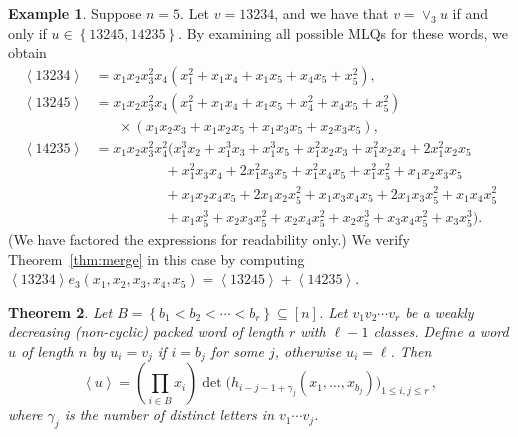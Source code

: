 \documentclass[reqno]{amsart}
\newcommand{\0}{\phantom{c}}
\newcommand{\swt}[1]{\left\langle #1 \right\rangle} %
\newcommand{\merge}[1]{\vee_{#1}} %
\let\prodnonlimits\prod
\renewcommand{\prod}{\prodnonlimits\limits}
\newcommand{\set}[1]{\left\{ #1 \right\}}
\newcommand{\ive}[1]{\left[ #1 \right]}
\theoremstyle{plain}
\newtheorem{thm}{Theorem}[section]
\theoremstyle{definition}
\newtheorem{example}[thm]{Example}
\numberwithin{equation}{section}
\begin{document}
\begin{example}
Suppose $n = 5$.
Let $v = 13234$, and we have that $v = \merge{3} u$ if and only if $u \in \set{13245, 14235}$.
By examining all possible MLQs for these words, we obtain
\begin{align*}
\swt{13234} & = x_1 x_2 x_3^2 x_4 (x_1^2 + x_1 x_4 + x_1 x_5 + x_4 x_5 + x_5^2),
\\ \swt{13245} & = x_1 x_2 x_3^2 x_4 (x_1^2 + x_1x_4 + x_1x_5 + x_4^2 + x_4x_5 + x_5^2)
\\ & \hspace{20pt} \times (x_1x_2x_3 + x_1x_2x_5+x_1x_3x_5+x_2x_3x_5),
\\ \swt{14235} & = x_1x_2x_3^2x_4^2 (x_1^3x_2 + x_1^3x_3 + x_1^3x_5 + x_1^2x_2x_3 + x_1^2x_2x_4 + 2x_1^2x_2x_5
\\ & \hspace{60pt} + x_1^2x_3x_4 + 2x_1^2x_3x_5 + x_1^2x_4x_5 + x_1^2x_5^2 + x_1x_2x_3x_5
\\ & \hspace{60pt} + x_1x_2x_4x_5 + 2x_1x_2x_5^2 + x_1x_3x_4x_5 + 2x_1x_3x_5^2 + x_1x_4x_5^2
\\ & \hspace{60pt} + x_1x_5^3 + x_2x_3x_5^2 + x_2x_4x_5^2 + x_2x_5^3 + x_3x_4x_5^2 + x_3x_5^3).
\end{align*}
(We have factored the expressions for readability only.)
We verify Theorem~\ref{thm:merge} in this case by computing $\swt{13234} e_3(x_1, x_2, x_3, x_4, x_5) = \swt{13245} + \swt{14235}$.
\end{example}


\begin{thm}
\label{thm:determinant_form}
  Let $B = \set{b_1 < b_2 < \cdots < b_r} \subseteq \ive{n}$.
  Let $v_1v_2 \dotsm v_r$ be a weakly decreasing (non-cyclic) packed word of length $r$ with $\ell-1$ classes.
  Define a word $u$ of length $n$ by $u_i = v_j$ if $i = b_j$ for some $j$, otherwise $u_i = \ell$.
  Then
  \[
  \swt{u} = \left( \prod_{i\in B} x_i \right) \det\bigl( h_{i-j-1+\gamma_j}(x_1, \dotsc, x_{b_j}) \bigr)_{1\leq i,j\leq r}\,,
  \]
  where $\gamma_j$ is the number of distinct letters in $v_1 \dotsm v_j$.
\end{thm}
\end{document}
